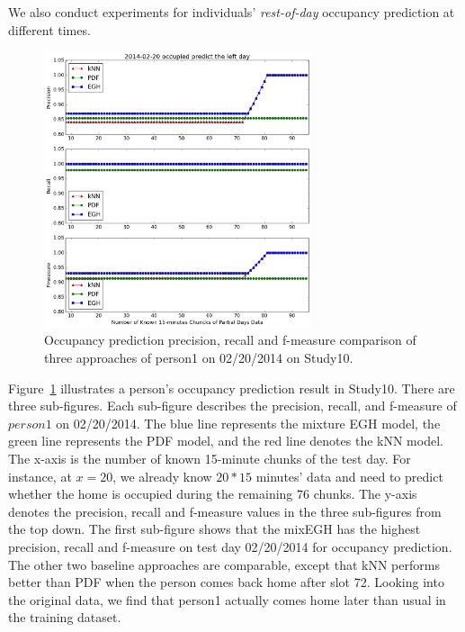 We also conduct experiments for individuals' {\em rest-of-day} occupancy prediction at different times. 
\begin{figure}[h]
\centering
\includegraphics[width=0.7\textwidth]{adlfigs/study10person12014-02-20occupied.png}
\caption{Occupancy prediction precision, recall and f-measure comparison of three approaches 
of person1 on 02/20/2014 on Study10.}
\label{fig_study10}
\end{figure}
Figure~\ref{fig_study10} illustrates a person's occupancy prediction result in Study10.
There are three sub-figures. 
Each sub-figure describes the 
precision, recall, and f-measure 
of $person1$ on 02/20/2014. 
The blue line represents the mixture EGH model,
the green line represents the PDF model,
and the red line denotes the kNN model. 
The x-axis is the number of known 15-minute chunks of the test day. 
For instance, at $x=20$, 
we already know $20*15$ minutes' data 
and need to predict whether the home is occupied during the remaining $76$ chunks. 
The y-axis denotes the precision, recall and f-measure values 
in the three sub-figures from the top down. 
The first sub-figure shows that  
the mixEGH has the highest precision, recall and f-measure on test day 02/20/2014 
for occupancy prediction. The other two baseline approaches are comparable, except that kNN performs better than PDF 
when the person comes back home after slot 72. 
Looking into the original data, we find that person1 actually comes home later than usual 
in the training dataset. 

